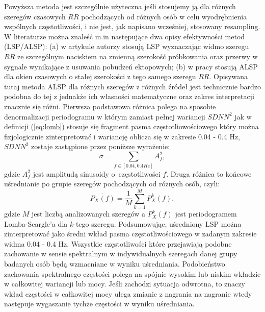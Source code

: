 Powyższa metoda jest szczególnie użyteczna jeśli stosujemy ją dla różnych szeregów
czasowych $RR$ pochodzących od różnych osób w celu wyodrębnienia wspólnych częstotliwości,
i nie jest, jak napisano wcześniej, stosowany resampling. W literaturze można znaleść m.in
następujące dwa opisy efektywności metod (LSP/ALSP): (a) w artykule \cite{laguna} autorzy 
stosują LSP wyznaczając widmo szeregu $RR$ ze szczególnym naciskiem na zmienną szerokość próbkowania oraz przerwy w sygnale wynikające z usuwania pobudzeń ektopowych; (b) w pracy
\cite{thong} stosują ALSP dla okien czasowych o stałej szerokości z tego
samego szeregu $RR$. Opisywana tutaj metoda ALSP dla różnych szeregów z różnych źródeł
jest technicznie bardzo podobna do tej z \cite{thong} jednakże ich własności matematyczne
oraz zakres interpretacji znacznie się różni. Pierwsza podstawowa różnica polega na sposobie
denormalizacji periodogramu w którym zamiast pełnej wariancji $SDNN^2$ jak w definicji
(\ref{eq:lomb}) stosuje się fragment pasma częstotliowościowego który można fizjologicznie
zinterpretować i wariancję oblicza się w zakresie 0.04 - 0.4 Hz, $SDNN^2$ zostaje zastąpione
przez poniższe wyrażenie:
\begin{equation}
  \sigma = \sum_{f\in[0.04,0.4Hz]}A_f^2,
\end{equation}
gdzie $A_f^2$ jest amplitudą sinusoidy o~częstotliwości $f$. Druga różnica to końcowe
uśrednianie po grupie szeregów pochodzących od różnych osób, czyli:
\begin{equation}
  \overline{P_{X}(f)} = \frac{1}{M}\sum_{k=1}^{M}P_{X}^k(f),
  \label{eq:alsp}
\end{equation}
gdzie $M$ jest liczbą analizowanych szeregów a $P_{X}^k(f)$ jest periodogramem
Lomba-Scargle'a dla $k$-tego szeregu. Podsumowując, uśredniony LSP można zinterpretować
jako średni wkład pasma częstotliwościowego w zadanym zakresie widma 0.04 - 0.4 Hz.
Wszystkie częstotliwości które przejawiają podobne zachowanie w sensie spektralnym w 
indywidualnych szeregach danej grupy badanych osób będą wzmacniane w wyniku uśredniania.
Podobieństwo zachowania spektralnego częstości polega na spójnie wysokim lub niskim
wkładzie w całkowitej wariancji lub mocy. Jeśli zachodzi sytuacja odwrotna, to znaczy wkład
częstości w całkowitej mocy ulega zmianie z nagrania na nagranie wtedy następuje wygaszanie
tychże częstości w wyniku uśredniania.